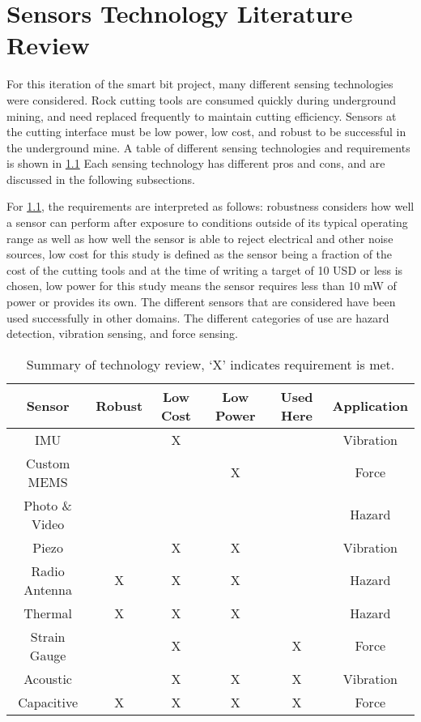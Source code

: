 \chapter{Sensors Technology Literature Review\label{chap:3}}

For this iteration of the smart bit project, many different sensing technologies were considered.
Rock cutting tools are consumed quickly during underground mining, and need replaced frequently
to maintain cutting efficiency. 
Sensors at the cutting interface must be low power, low cost, and robust 
to be successful in the underground mine.
A table of different sensing technologies and requirements is shown in \ref{tab:sense_review}
Each sensing technology has different pros and cons, and are discussed in the following subsections.

For \ref{tab:sense_review}, the requirements are interpreted as follows:
robustness considers how well a sensor can perform after exposure to 
conditions outside of its typical operating range as well as how well the 
sensor is able to reject electrical and other noise sources,
low cost for this study is defined as the sensor being a fraction of the cost
of the cutting tools and at the time of writing a target of 10 USD or less is chosen,
low power for this study means the sensor requires less than 10 mW of power or provides its own.
The different sensors that are considered have been used successfully in other domains. 
The different categories of use are hazard detection, vibration sensing, and force sensing.


\begin{table}[]
\centering
\caption{Summary of technology review, `X' indicates requirement is met.}
\label{tab:sense_review}
\begin{tabular}{|c|c|c|c|c|c|}
\hline
Sensor         & Robust & Low Cost & Low Power & Used Here & Application \\ \hline
IMU            &        & X        &           &           & Vibration   \\ \hline
Custom MEMS    &        &          & X         &           & Force       \\ \hline
Photo \& Video &        &          &           &           & Hazard      \\ \hline
Piezo          &        & X        & X         &           & Vibration   \\ \hline
Radio Antenna  & X      & X        & X         &           & Hazard      \\ \hline
Thermal        & X      & X        & X         &           & Hazard      \\ \hline
Strain Gauge   &        & X        &           & X         & Force       \\ \hline
Acoustic       &        & X        & X         & X         & Vibration   \\ \hline
Capacitive     & X      & X        & X         & X         & Force       \\ \hline
\end{tabular}
\end{table}

